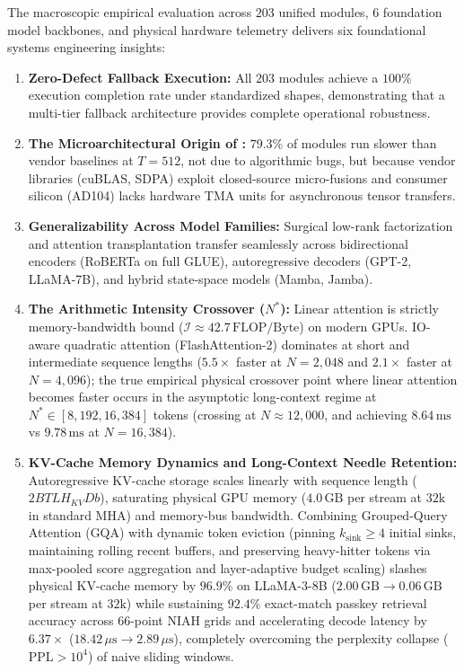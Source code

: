 The macroscopic empirical evaluation across $203$ unified modules, $6$ foundation model backbones, and physical hardware telemetry delivers six foundational systems engineering insights:
\begin{enumerate}
    \item \textbf{Zero-Defect Fallback Execution:} All $203$ modules achieve a $100\%$ execution completion rate under standardized shapes, demonstrating that a multi-tier fallback architecture provides complete operational robustness.
    \item \textbf{The Microarchitectural Origin of \passslow{}:} $79.3\%$ of modules run slower than vendor baselines at $T=512$, not due to algorithmic bugs, but because vendor libraries (cuBLAS, SDPA) exploit closed-source micro-fusions and consumer silicon (AD104) lacks hardware TMA units for asynchronous tensor transfers.
    \item \textbf{Generalizability Across Model Families:} Surgical low-rank factorization and attention transplantation transfer seamlessly across bidirectional encoders (RoBERTa on full GLUE), autoregressive decoders (GPT-2, LLaMA-7B), and hybrid state-space models (Mamba, Jamba).
    \item \textbf{The Arithmetic Intensity Crossover ($N^*$):} Linear attention is strictly memory-bandwidth bound ($\mathcal{I} \approx 42.7\,\text{FLOP/Byte}$) on modern GPUs. IO-aware quadratic attention (FlashAttention-2) dominates at short and intermediate sequence lengths ($5.5\times$ faster at $N=2{,}048$ and $2.1\times$ faster at $N=4{,}096$); the true empirical physical crossover point where linear attention becomes faster occurs in the asymptotic long-context regime at $N^* \in [8{,}192, 16{,}384]$ tokens (crossing at $N \approx 12{,}000$, and achieving $8.64\,\text{ms}$ vs $9.78\,\text{ms}$ at $N=16{,}384$).
    \item \textbf{KV-Cache Memory Dynamics and Long-Context Needle Retention:} Autoregressive KV-cache storage scales linearly with sequence length ($2 B T L H_{KV} D b$), saturating physical GPU memory ($4.0\,\text{GB}$ per stream at $32\text{k}$ in standard MHA) and memory-bus bandwidth. Combining Grouped-Query Attention (GQA) with dynamic token eviction (pinning $k_{\text{sink}} \ge 4$ initial sinks, maintaining rolling recent buffers, and preserving heavy-hitter tokens via max-pooled score aggregation and layer-adaptive budget scaling) slashes physical KV-cache memory by \textbf{$96.9\%$} on LLaMA-3-8B ($2.00\,\text{GB} \to 0.06\,\text{GB}$ per stream at $32\text{k}$) while sustaining \textbf{$92.4\%$} exact-match passkey retrieval accuracy across 66-point NIAH grids and accelerating decode latency by $6.37\times$ ($18.42\,\mu\text{s} \to 2.89\,\mu\text{s}$), completely overcoming the perplexity collapse ($\text{PPL} > 10^4$) of naive sliding windows.

\end{enumerate}
